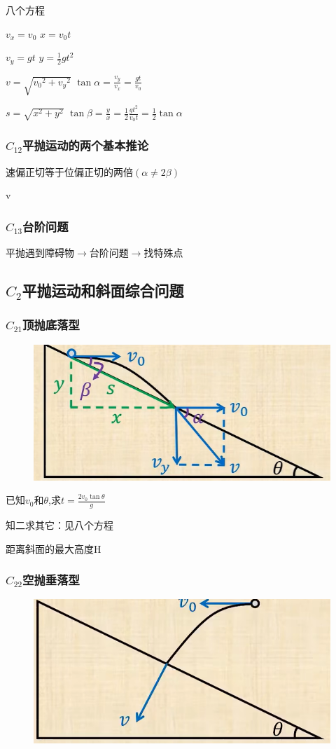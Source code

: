 \documentclass[lang=cn,10pt]{elegantbook}
\begin{document}
        八个方程
        
       $v_x=v_0\,\,x=v_0t$
        
        $v_y=gt\,\,y=\frac{1}{2}gt^2$
       
        $v=\sqrt{{v_0}^2+{v_y}^2}\,\, \tan \alpha =\frac{v_y}{v_x}=\frac{gt}{v_0}$
        
        $s=\sqrt{x^2+y^2}\,\, \tan \beta =\frac{y}{x}=\frac{1}{2}\frac{gt^2}{v_0t}=\frac{1}{2}\tan \alpha $
        \subsubsection{$C_{12}$平抛运动的两个基本推论}
        
        速偏正切等于位偏正切的两倍$(\alpha\neq2\beta)$
        
        v
        \subsubsection{$C_{13}$台阶问题}
        平抛遇到障碍物$\rightarrow$台阶问题$\rightarrow$找特殊点
        \vspace{3cm}
        \subsection{$C_2$平抛运动和斜面综合问题}
        \subsubsection{$C_{21}$顶抛底落型}
       \begin{figure}[H]
       	\centering
       	\includegraphics[width=0.3\linewidth]{image/47}
       \end{figure}
       
       已知$v_0$和$\theta$,求$t=\frac{2v_{0}\tan\theta}{g}$
        
       知二求其它：见八个方程
       
        距离斜面的最大高度H
        
        \subsubsection{$C_{22}$空抛垂落型}
        \begin{figure}[H]
        	\centering
        	\includegraphics[width=0.3\linewidth]{image/48}
        \end{figure}
        
\end{document}
